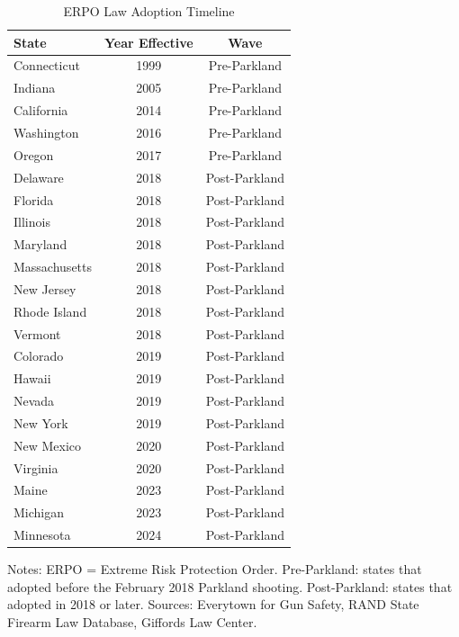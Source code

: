 \begin{table}[H]
\centering
\caption{ERPO Law Adoption Timeline}
\label{tab:erpo_adoption}
\begin{threeparttable}
\begin{tabular}{lcc}
\toprule
State & Year Effective & Wave \\
\midrule
Connecticut & 1999 & Pre-Parkland \\
Indiana & 2005 & Pre-Parkland \\
California & 2014 & Pre-Parkland \\
Washington & 2016 & Pre-Parkland \\
Oregon & 2017 & Pre-Parkland \\
Delaware & 2018 & Post-Parkland \\
Florida & 2018 & Post-Parkland \\
Illinois & 2018 & Post-Parkland \\
Maryland & 2018 & Post-Parkland \\
Massachusetts & 2018 & Post-Parkland \\
New Jersey & 2018 & Post-Parkland \\
Rhode Island & 2018 & Post-Parkland \\
Vermont & 2018 & Post-Parkland \\
Colorado & 2019 & Post-Parkland \\
Hawaii & 2019 & Post-Parkland \\
Nevada & 2019 & Post-Parkland \\
New York & 2019 & Post-Parkland \\
New Mexico & 2020 & Post-Parkland \\
Virginia & 2020 & Post-Parkland \\
Maine & 2023 & Post-Parkland \\
Michigan & 2023 & Post-Parkland \\
Minnesota & 2024 & Post-Parkland \\
\bottomrule
\end{tabular}
\begin{tablenotes}[flushleft]
\small
\item Notes: ERPO = Extreme Risk Protection Order. Pre-Parkland: states that adopted before the February 2018 Parkland shooting. Post-Parkland: states that adopted in 2018 or later. Sources: Everytown for Gun Safety, RAND State Firearm Law Database, Giffords Law Center.
\end{tablenotes}
\end{threeparttable}
\end{table}
